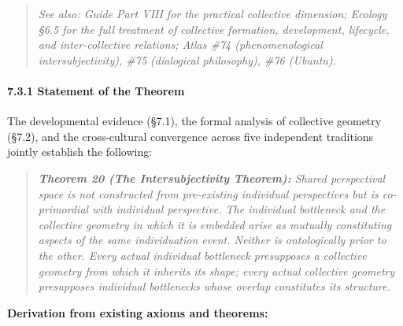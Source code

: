 \begin{quote}
\itshape
\textit{See also: Guide Part VIII for the practical collective dimension; Ecology §6.5 for the full treatment of collective formation, development, lifecycle, and inter-collective relations; Atlas \#74 (phenomenological intersubjectivity), \#75 (dialogical philosophy), \#76 (Ubuntu).}
\end{quote}


\paragraph*{7.3.1 Statement of the Theorem}


The developmental evidence (§7.1), the formal analysis of collective geometry (§7.2), and the cross-cultural convergence across five independent traditions jointly establish the following:


\begin{quote}
\itshape
\textbf{Theorem 20 (The Intersubjectivity Theorem):} \textit{Shared perspectival space is not constructed from pre-existing individual perspectives but is co-primordial with individual perspective. The individual bottleneck and the collective geometry in which it is embedded arise as mutually constituting aspects of the same individuation event. Neither is ontologically prior to the other. Every actual individual bottleneck presupposes a collective geometry from which it inherits its shape; every actual collective geometry presupposes individual bottlenecks whose overlap constitutes its structure.}
\end{quote}


\textbf{Derivation from existing axioms and theorems:}



